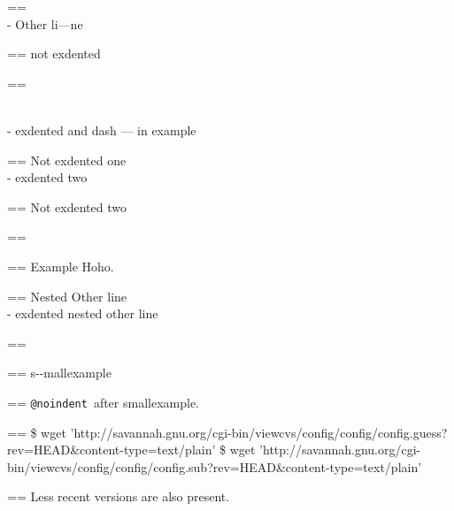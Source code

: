 \documentclass{book}
\makeatletter
\newenvironment{Texinfopreformatted}{%
  \par\GNUTobeylines\obeyspaces\frenchspacing\parskip=\z@\parindent=\z@}{}
{\catcode`\^^M=13 \gdef\GNUTobeylines{\catcode`\^^M=13 \def^^M{\null\par}}}
\newenvironment{Texinfoindented}{\begin{list}{}{}\item\relax}{\end{list}}
\renewcommand{\_}{\Texinfounderscore\discretionary{}{}{}}
\makeatother
\begin{document}
{{\begin{Texinfoindented}
\begin{Texinfoindented}
\begin{Texinfopreformatted}
\end{Texinfopreformatted}
\leavevmode{}\\
\hbox{\kern -\leftmargin}%
Other li---ne
\\
\begin{Texinfopreformatted}%
\ttfamily not exdented
\end{Texinfopreformatted}
\end{Texinfoindented}
\begin{Texinfopreformatted}%
\ttfamily 
\end{Texinfopreformatted}
\begin{Texinfoindented}
\leavevmode{}\\
\hbox{\kern -\leftmargin}%
exdented  and dash --- in example
\\
\begin{Texinfopreformatted}%
\ttfamily Not exdented one
\end{Texinfopreformatted}
\leavevmode{}\\
\hbox{\kern -\leftmargin}%
exdented two
\\
\begin{Texinfopreformatted}%
\ttfamily Not exdented two
\end{Texinfopreformatted}
\end{Texinfoindented}
\begin{Texinfopreformatted}%
\ttfamily 
\end{Texinfopreformatted}
\begin{Texinfoindented}
\begin{Texinfopreformatted}%
\ttfamily Example   Hoho.
\end{Texinfopreformatted}
\begin{Texinfoindented}
\begin{Texinfopreformatted}%
\ttfamily Nested Other line
\end{Texinfopreformatted}
\leavevmode{}\\
\hbox{\kern -\leftmargin}%
exdented nested other line
\\
\end{Texinfoindented}
\end{Texinfoindented}
\begin{Texinfopreformatted}%
\ttfamily 
\end{Texinfopreformatted}
\begin{Texinfopreformatted}%
\ttfamily \footnotesize s{-}{-}mallexample
\end{Texinfopreformatted}
\begin{Texinfopreformatted}%
\ttfamily 
\texttt{@noindent}\ after smallexample.
\end{Texinfopreformatted}
\begin{Texinfopreformatted}%
\ttfamily \footnotesize \$ wget 'http://savannah.gnu.org/cgi-bin/viewcvs/config/config/config.guess?rev=HEAD\&content-type=text/plain'
\$ wget 'http://savannah.gnu.org/cgi-bin/viewcvs/config/config/config.sub?rev=HEAD\&content-type=text/plain'
\end{Texinfopreformatted}
\begin{Texinfopreformatted}%
\ttfamily \noindent{}Less recent versions are also present.


\end{Texinfopreformatted}
\end{Texinfoindented}}}
\end{document}

